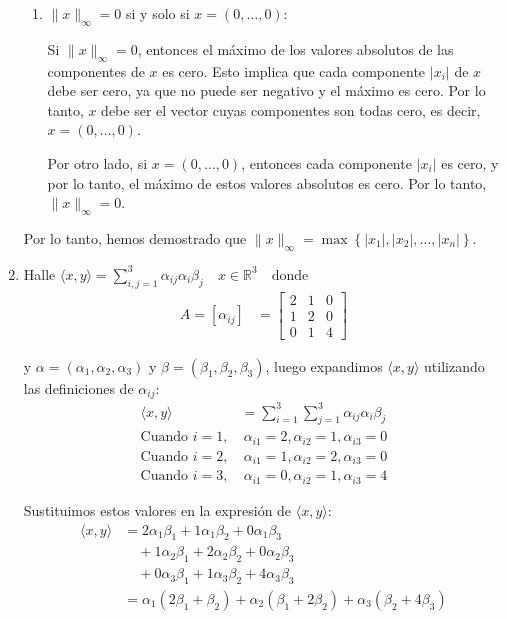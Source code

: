 \documentclass{report}
\begin{document}
\begin{enumerate}
\begin{enumerate}
                \item $\|x\|_{\infty}=0$ si y solo si $x=(0, \ldots, 0)$:
                
                Si $\|x\|_{\infty}=0$, entonces el máximo de los valores absolutos de las componentes de $x$ es cero. Esto implica que cada componente $\left|x_i\right|$ de $x$ debe ser cero, ya que no puede ser negativo y el máximo es cero. Por lo tanto, $x$ debe ser el vector cuyas componentes son todas cero, es decir, $x=(0, \ldots, 0)$.
                
                Por otro lado, si $x=(0, \ldots, 0)$, entonces cada componente $\left|x_i\right|$ es cero, y por lo tanto, el máximo de estos valores absolutos es cero. Por lo tanto, $\|x\|_{\infty}=0$.
            \end{enumerate}

            Por lo tanto, hemos demostrado que $\|x\|_{\infty}=\max \left\{\left|x_1\right|,\left|x_2\right|, \ldots, \left|x_n\right|\right\}$.
        
        \item Halle $\langle x, y\rangle = \sum_{i, j=1}^3 \alpha_{ij} \alpha_i \beta_j \quad x \in \mathbb{R}^3 \quad \text{donde}$
        \begin{align*}
            A=\left[\alpha_{ij}\right] &= \left[\begin{array}{lll}
            2 & 1 & 0 \\
            1 & 2 & 0 \\
            0 & 1 & 4
            \end{array}\right]
        \end{align*}

        y $\alpha=\left(\alpha_1, \alpha_2, \alpha_3\right)$ y $\beta=\left(\beta_1, \beta_2, \beta_3\right)$, luego expandimos $\langle x, y\rangle$ utilizando las definiciones de $\alpha_{ij}$:
        \begin{align*}
            \langle x, y\rangle &= \sum_{i=1}^3 \sum_{j=1}^3 \alpha_{ij} \alpha_i \beta_j \\
            \text{Cuando } i=1, &\ \alpha_{i1}=2, \alpha_{i2}=1, \alpha_{i3}=0 \\
            \text{Cuando } i=2, &\ \alpha_{i1}=1, \alpha_{i2}=2, \alpha_{i3}=0 \\
            \text{Cuando } i=3, &\ \alpha_{i1}=0, \alpha_{i2}=1, \alpha_{i3}=4
        \end{align*}

        Sustituimos estos valores en la expresión de $\langle x, y\rangle$:
        \begin{align*}
            \langle x, y\rangle &= 2 \alpha_1 \beta_1 + 1 \alpha_1 \beta_2 + 0 \alpha_1 \beta_3 \\
            &\quad + 1 \alpha_2 \beta_1 + 2 \alpha_2 \beta_2 + 0 \alpha_2 \beta_3 \\
            &\quad + 0 \alpha_3 \beta_1 + 1 \alpha_3 \beta_2 + 4 \alpha_3 \beta_3 \\
            &= \alpha_1(2 \beta_1 + \beta_2) + \alpha_2(\beta_1 + 2 \beta_2) + \alpha_3(\beta_2 + 4 \beta_3)
        \end{align*}
            \end{enumerate}
    
\end{document}
